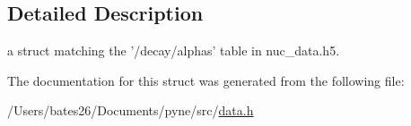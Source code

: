\subsection{Detailed Description}
a struct matching the '/decay/alphas' table in nuc\+\_\+data.\+h5. 

The documentation for this struct was generated from the following file\+:\begin{DoxyCompactItemize}
\item 
/\+Users/bates26/\+Documents/pyne/src/\hyperlink{data_8h}{data.\+h}\end{DoxyCompactItemize}

